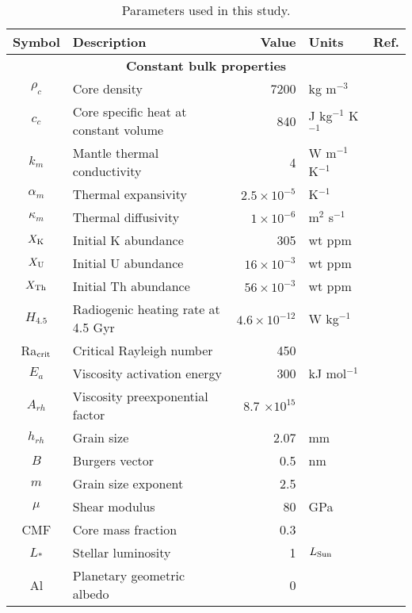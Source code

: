 \begin{table}
\centering
\caption{Parameters used in this study. \label{tab:params}}
\footnotesize
\begin{tabular}{@{} c l r l p{4cm} @{}}
\toprule
Symbol & Description & Value & Units & Ref. \\
\midrule
\multicolumn{5}{c}{\textbf{Constant bulk properties}} \\
$\rho_c$ & Core density & 7200 & kg m$^{-3}$ &  \citet{Thiriet2019}  \\
$c_c$ & Core specific heat at constant volume & 840 & J kg$^{-1}$ K$^{-1}$  & \citet{Thiriet2019}  \\
$k_m$ & Mantle thermal conductivity & 4 & W m$^{-1}$ K$^{-1}$  & \citet{Thiriet2019}  \\
$\alpha_m$ & Thermal expansivity &  $2.5 \times 10^{-5}$ & K$^{-1}$  & \citet{Thiriet2019}  \\
$\kappa_m$ & Thermal diffusivity &  $1 \times 10^{-6}$ & m$^2$ s$^{-1}$  & \citet{Thiriet2019}  \\
$X_{\rm K}$ & Initial K abundance &  305 & wt ppm  & \citet{Jaupart2015} \\
$X_{\rm U}$ & Initial U abundance &  $16 \times 10^{-3}$ & wt ppm  & \citet{Jaupart2015} \\
$X_{\rm Th}$ & Initial Th abundance &  $56 \times 10^{-3}$ & wt ppm  & \citet{Jaupart2015} \\
$H_{4.5}$ & Radiogenic heating rate at 4.5 Gyr & $4.6\times 10^{-12}$ & W kg$^{-1}$ & \citet{Jaupart2015} \\
Ra$_{\rm crit}$ & Critical Rayleigh number & 450 &  & \citet{Thiriet2019}  \\
$E_a$ & Viscosity activation energy & 300 & kJ mol$^{-1}$ & \citet{Karato1993} \\
$A_{rh}$ & Viscosity preexponential factor & 8.7 $\times 10^{15}$ & & \citet{Karato1993} \\
$h_{rh}$ & Grain size & 2.07 & mm & \\
$B$ & Burgers vector & 0.5 & nm & \citet{Karato1993} \\
$m$ & Grain size exponent & 2.5 & & \citet{Karato1993} \\
$\mu$ & Shear modulus & 80 & GPa & \citet{Karato1993} \\
CMF & Core mass fraction & 0.3 & & \\
$L_*$ & Stellar luminosity & 1 & $L_{\rm Sun}$ &  \\
Al & Planetary geometric albedo & 0 & &  \\


\end{tabular}
\end{table}
